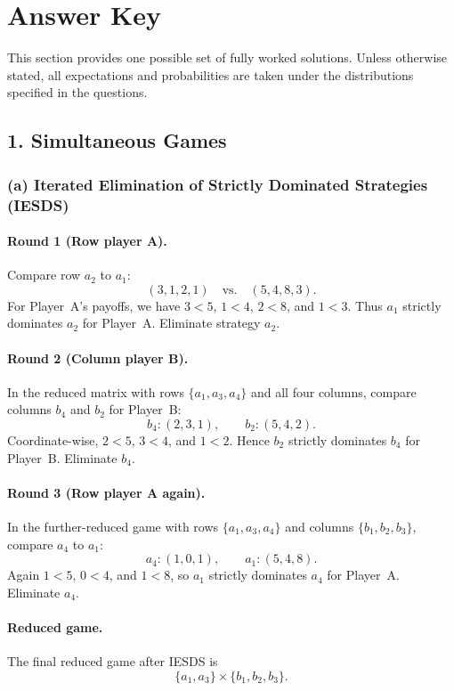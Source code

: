 \documentclass[12pt,a4paper]{article}
\begin{document}
\section*{Answer Key}

This section provides one possible set of fully worked solutions. Unless otherwise stated,
all expectations and probabilities are taken under the distributions specified in the questions.

\subsection*{1. Simultaneous Games}

\subsubsection*{(a) Iterated Elimination of Strictly Dominated Strategies (IESDS)}

\paragraph{Round 1 (Row player A).}
Compare row \(a_2\) to \(a_1\):
\[
  (3,1,2,1) \quad \text{vs.} \quad (5,4,8,3).
\]
For Player~A's payoffs, we have \(3 < 5\), \(1 < 4\), \(2 < 8\), and \(1 < 3\). Thus \(a_1\) strictly
dominates \(a_2\) for Player~A. Eliminate strategy \(a_2\).

\paragraph{Round 2 (Column player B).}
In the reduced matrix with rows \(\{a_1,a_3,a_4\}\) and all four columns, compare columns \(b_4\)
and \(b_2\) for Player~B:
\[
  b_4: (2,3,1), \qquad b_2: (5,4,2).
\]
Coordinate-wise, \(2<5\), \(3<4\), and \(1<2\). Hence \(b_2\) strictly dominates \(b_4\) for
Player~B. Eliminate \(b_4\).

\paragraph{Round 3 (Row player A again).}
In the further-reduced game with rows \(\{a_1,a_3,a_4\}\) and columns \(\{b_1,b_2,b_3\}\),
compare \(a_4\) to \(a_1\):
\[
  a_4: (1,0,1), \qquad a_1: (5,4,8).
\]
Again \(1 < 5\), \(0 < 4\), and \(1 < 8\), so \(a_1\) strictly dominates \(a_4\) for Player~A.
Eliminate \(a_4\).

\paragraph{Reduced game.}
The final reduced game after IESDS is
\[
  \{a_1,a_3\} \times \{b_1,b_2,b_3\}.
\]
\end{document}
